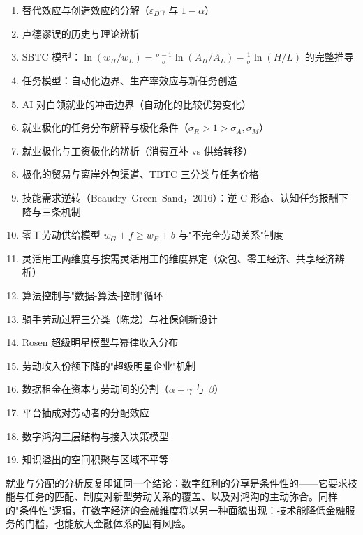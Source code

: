 \begin{chapterbox}
\begin{enumerate}
\item 替代效应与创造效应的分解（$\varepsilon_D \gamma$ 与 $1-\alpha$）
\item 卢德谬误的历史与理论辨析 
\item SBTC 模型：$\ln(w_H/w_L) = \frac{\sigma-1}{\sigma}\ln(A_H/A_L) - \frac{1}{\sigma}\ln(H/L)$ 的完整推导 
\item 任务模型：自动化边界、生产率效应与新任务创造 
\item AI 对白领就业的冲击边界（自动化的比较优势变化）
\item 就业极化的任务分布解释与极化条件（$\sigma_R > 1 > \sigma_A, \sigma_M$）
\item 就业极化与工资极化的辨析（消费互补 vs 供给转移）
\item 极化的贸易与离岸外包渠道、TBTC 三分类与任务价格 
\item 技能需求逆转（Beaudry–Green–Sand，2016）：逆 C 形态、认知任务报酬下降与三条机制 
\item 零工劳动供给模型 $w_G + f \geq w_E + b$ 与"不完全劳动关系"制度 
\item 灵活用工两维度与按需灵活用工的维度界定（众包、零工经济、共享经济辨析）
\item 算法控制与"数据-算法-控制"循环 
\item 骑手劳动过程三分类（陈龙）与社保创新设计 
\item Rosen 超级明星模型与幂律收入分布 
\item 劳动收入份额下降的"超级明星企业"机制 
\item 数据租金在资本与劳动间的分割（$\alpha + \gamma$ 与 $\beta$）
\item 平台抽成对劳动者的分配效应 
\item 数字鸿沟三层结构与接入决策模型 
\item 知识溢出的空间积聚与区域不平等 
\end{enumerate}
\end{chapterbox}

就业与分配的分析反复印证同一个结论：数字红利的分享是条件性的——它要求技能与任务的匹配、制度对新型劳动关系的覆盖、以及对鸿沟的主动弥合。同样的"条件性"逻辑，在数字经济的金融维度将以另一种面貌出现：技术能降低金融服务的门槛，也能放大金融体系的固有风险。
